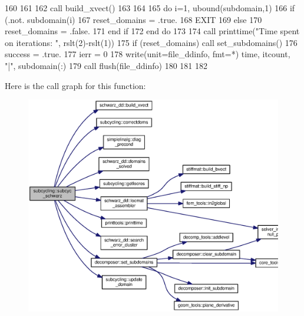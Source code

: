 \begin{DoxyCode}
160             
161                   
162         \textcolor{keyword}{call }build_xvect()
163 
164             
165         \textcolor{keywordflow}{do} i=1, ubound(subdomain,1)
166           \textcolor{keywordflow}{if} (.not. subdomain(i)%
167             reset\_domains = .true.
168             \textcolor{keywordflow}{EXIT}
169           \textcolor{keywordflow}{else}
170             reset\_domains = .false.
171 \textcolor{keywordflow}{          end if}
172 \textcolor{keywordflow}{        end do}
173               
174         \textcolor{keyword}{call }printtime(\textcolor{stringliteral}{"Time spent on iterations: "}, rslt(2)-rslt(1))
175         \textcolor{keywordflow}{if} (reset\_domains) \textcolor{keyword}{call }set_subdomains()
176         success = .true.
177         ierr = 0
178         \textcolor{keyword}{write}(unit=file_ddinfo, fmt=*) time, itcount, \textcolor{stringliteral}{"|"}, subdomain(:)%
179         \textcolor{keyword}{call }flush(file_ddinfo)
180              
181 
182 
\end{DoxyCode}


Here is the call graph for this function\+:\nopagebreak
\begin{figure}[H]
\begin{center}
\leavevmode
\includegraphics[width=350pt]{namespacesubcycling_a676c0ac81f3576e037f6f49c0001ce78_cgraph}
\end{center}
\end{figure}


